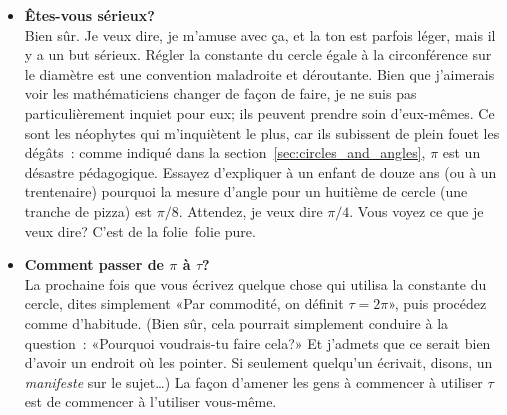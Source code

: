 \begin{itemize}

  \item \textbf{Êtes-vous sérieux\ns?} \\ Bien sûr. Je veux dire, je m'amuse avec
  ça, et la ton est parfois léger, mais il y a un but sérieux. Régler la
  constante du cercle égale à la circonférence sur le diamètre est une
  convention maladroite et déroutante. Bien que j'aimerais voir les
  mathématiciens changer de façon de faire, je ne suis pas particulièrement
  inquiet pour eux\ns; ils peuvent prendre soin d'eux-mêmes. Ce sont les
  néophytes qui m'inquiètent le plus, car ils subissent de plein fouet les
  dégâts~: comme indiqué dans la section~\ref{sec:circles_and_angles}, $\pi$ est
  un désastre pédagogique. Essayez d'expliquer à un enfant de douze ans (ou à un
  trentenaire) pourquoi la mesure d'angle pour un huitième de cercle (une 
  tranche de pizza) est $\pi/8$. Attendez, je veux dire $\pi/4$. Vous voyez ce
  que je veux dire\ns? C'est de la folie\textellipsis\ folie pure.

  \item \textbf{Comment passer de $\pi$ à $\tau$\ns?} \\ La prochaine fois que
  vous écrivez quelque chose qui utilisa la constante du cercle, dites
  simplement «\ns Par commodité, on définit $\tau=2\pi$\ns », puis procédez comme
  d'habitude. (Bien sûr, cela pourrait simplement conduire à la question~:
  «\ns Pourquoi voudrais-tu faire cela\ns?\ns » Et j'admets que ce serait bien
  d'avoir un endroit où les pointer. Si seulement quelqu'un écrivait, disons, un
  \emph{manifeste} sur le sujet\ldots) La façon d'amener les gens à commencer à
  utiliser $\tau$ est de commencer à l'utiliser vous-même.


\end{itemize}
